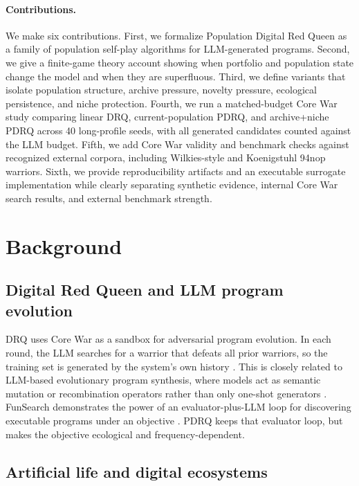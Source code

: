 \documentclass[11pt]{article}
\begin{document}
\paragraph{Contributions.}
We make six contributions. First, we formalize Population Digital Red Queen as a family of population self-play algorithms for LLM-generated programs. Second, we give a finite-game theory account showing when portfolio and population state change the model and when they are superfluous. Third, we define variants that isolate population structure, archive pressure, novelty pressure, ecological persistence, and niche protection. Fourth, we run a matched-budget Core War study comparing linear DRQ, current-population PDRQ, and archive+niche PDRQ across 40 long-profile seeds, with all generated candidates counted against the LLM budget. Fifth, we add Core War validity and benchmark checks against recognized external corpora, including Wilkies-style and Koenigstuhl 94nop warriors. Sixth, we provide reproducibility artifacts and an executable surrogate implementation while clearly separating synthetic evidence, internal Core War search results, and external benchmark strength.

\section{Background}

\subsection{Digital Red Queen and LLM program evolution}

DRQ uses Core War as a sandbox for adversarial program evolution. In each round, the LLM searches for a warrior that defeats all prior warriors, so the training set is generated by the system's own history \citep{kumar2026digital}. This is closely related to LLM-based evolutionary program synthesis, where models act as semantic mutation or recombination operators rather than only one-shot generators \citep{lehman2022elm,meyerson2024lmx}. FunSearch demonstrates the power of an evaluator-plus-LLM loop for discovering executable programs under an objective \citep{romeraparedes2024funsearch}. PDRQ keeps that evaluator loop, but makes the objective ecological and frequency-dependent.

\subsection{Artificial life and digital ecosystems}
\end{document}

